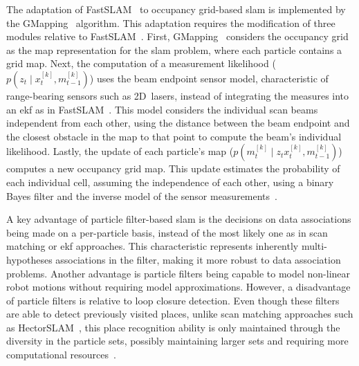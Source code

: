 The adaptation of FastSLAM~\cite{montemerlo:aaai:2002,montemerlo:ijcai:2003}
to occupancy grid-based \gls{slam} is implemented by the
GMapping~\cite{grisetti:tro:2007} algorithm.
This adaptation requires the modification of three modules relative to
FastSLAM~\cite{montemerlo:aaai:2002,montemerlo:ijcai:2003}.
First, GMapping~\cite{grisetti:tro:2007} considers the occupancy grid as
the map representation for the \gls{slam} problem,
where each particle contains a grid map.
Next, the computation of a measurement likelihood
($p\left(z_t \;\vert\; x_{t}^{\left[k\right]}, m_{t-1}^{\left[k\right]}\right)$)
uses the beam endpoint sensor model,
characteristic of range-bearing sensors such as 2D~lasers,
instead of integrating the measures into an \gls{ekf} as in
FastSLAM~\cite{montemerlo:aaai:2002,montemerlo:ijcai:2003}.
This model considers the individual scan beams independent from each other,
using the distance between the beam endpoint and the closest obstacle in
the map to that point to compute the beam's individual likelihood.
Lastly, the update of each particle's map
($p\left(m_t^{\left[k\right]} \;\vert\; z_t x_{t}^{\left[k\right]}, m_{t-1}^{\left[k\right]}\right)$)
computes a new occupancy grid map.
This update estimates the probability of each individual cell,
assuming the independence of each other,
using a binary Bayes filter and the inverse model
of the sensor measurements~\cite{thrun:book:2005}.

A key advantage of particle filter-based \gls{slam} is the decisions on
data associations being made on a per-particle basis,
instead of the most likely one as in scan matching or \gls{ekf} approaches.
This characteristic represents inherently multi-hypotheses associations
in the filter, making it more robust to data association problems.
Another advantage is particle filters being capable to model
non-linear robot motions without requiring model approximations. However,
a disadvantage of particle filters is relative to loop closure detection.
Even though these filters are able to detect previously visited places,
unlike scan matching approaches such as HectorSLAM~\cite{kohlbrecher:ssr:2011},
this place recognition ability is only maintained through the diversity
in the particle sets, possibly maintaining larger sets and
requiring more computational resources~\cite{thrun:book:2005}.

